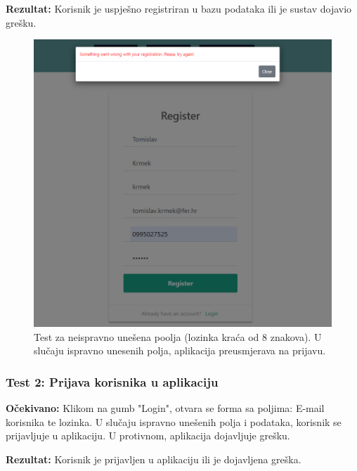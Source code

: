 		 		
		 		\noindent\textbf{Rezultat:} Korisnik je uspješno registriran u bazu podataka ili je sustav dojavio grešku.
		 		
				\begin{figure}[H]
		 			\begin{center}
		 				\includegraphics[width=15cm]{slike/neispravna_forma_registracija.PNG}
		 			\end{center}
		 			\caption{Test za neispravno unešena poolja (lozinka kraća od 8 znakova). U slučaju ispravno unesenih polja, aplikacija preusmjerava na prijavu.}
		 			\label{fig:inttest}
		 		\end{figure}
			\subsubsection{Test 2: Prijava korisnika u aplikaciju}
			\textbf{Očekivano:} Klikom na gumb "Login", otvara se forma sa poljima: E-mail korisnika te lozinka. U slučaju ispravno unešenih polja i podataka, korisnik se prijavljuje u aplikaciju. U protivnom, aplikacija dojavljuje grešku.
			
			\noindent\textbf{Rezultat:} Korisnik je prijavljen u aplikaciju ili je dojavljena greška.
			
